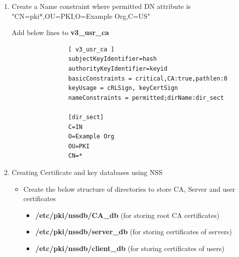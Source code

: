 \documentclass[a4paper]{article}
\begin{document}
\begin{enumerate}[label*=\arabic*.]
        Add below line to \textbf{server\_cert} section and create a new section \textbf{alt\_names}
        \begin{lstlisting}
             [ server_cert ]
             subjectAltName = @alt_names

            [alt_names]
            DNS.1 = *.example.org
       \end{lstlisting}

    \item Create a Name constraint where permitted DN attribute is "CN=pki*,OU=PKI,O=Example Org,C=US"

            Add below lines to \textbf{v3\_usr\_ca} 
            \begin{lstlisting}
                [ v3_usr_ca ]
                subjectKeyIdentifier=hash
                authorityKeyIdentifier=keyid
                basicConstraints = critical,CA:true,pathlen:0
                keyUsage = cRLSign, keyCertSign
                nameConstraints = permitted;dirName:dir_sect

                [dir_sect]
                C=IN
                O=Example Org
                OU=PKI
                CN=*
            \end{lstlisting}
    \item Creating Certificate and key databases using NSS 
        \begin{itemize}
            \item Create the below structure of directories to store CA, Server and user certificates
                \begin{itemize}
                    \item \textbf{/etc/pki/nssdb/CA\_db} (for storing root CA certificates)
                    \item \textbf{/etc/pki/nssdb/server\_db} (for storing certificates of servers)
                    \item \textbf{/etc/pki/nssdb/client\_db} (for storing certificates of users)
                \end{itemize}
            

\end{itemize}
\end{enumerate}
\end{document}
